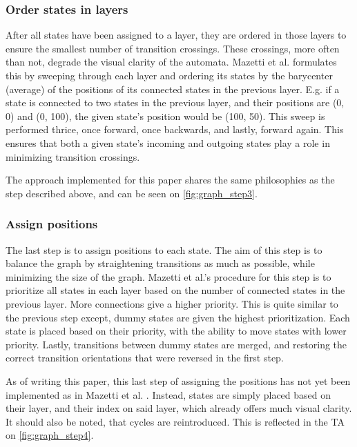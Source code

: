 \subsubsection{Order states in layers}
After all states have been assigned to a layer, they are ordered in those layers to ensure the smallest number of transition crossings. These crossings, more often than not, degrade the visual clarity of the automata.
Mazetti et al. formulates this by sweeping through each layer and ordering its states by the barycenter (average) of the positions of its connected states in the previous layer.
E.g. if a state is connected to two states in the previous layer, and their positions are (0, 0) and (0, 100), the given state's position would be (100, 50).
This sweep is performed thrice, once forward, once backwards, and lastly, forward again.
This ensures that both a given state's incoming and outgoing states play a role in minimizing transition crossings. \cite{Mazetti2012}

The approach implemented for this paper shares the same philosophies as the step described above, and can be seen on \cref{fig:graph_step3}.
\begin{center}
    
\end{center}

\subsubsection{Assign positions}
The last step is to assign positions to each state. The aim of this step is to balance the graph by straightening transitions as much as possible, while minimizing the size of the graph.
Mazetti et al.'s procedure for this step is to prioritize all states in each layer based on the number of connected states in the previous layer.
More connections give a higher priority. This is quite similar to the previous step except, dummy states are given the highest prioritization.
Each state is placed based on their priority, with the ability to move states with lower priority.
Lastly, transitions between dummy states are merged, and restoring the correct transition orientations that were reversed in the first step. \cite{Mazetti2012}

As of writing this paper, this last step of assigning the positions has not yet been implemented as in Mazetti et al. \cite{Mazetti2012}. Instead, states are simply placed based on their layer, and their index on said layer, which already offers much visual clarity. It should also be noted, that cycles are reintroduced. This is reflected in the TA on \cref{fig:graph_step4}.

\begin{center}
    
\end{center}
